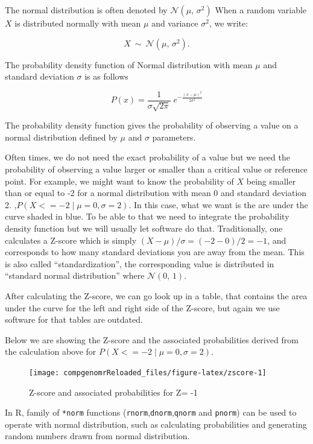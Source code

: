 \documentclass[12pt,]{krantz}
\theoremstyle{definition}
\theoremstyle{definition}
\theoremstyle{definition}
\theoremstyle{remark}
\begin{document}
The normal distribution is often denoted by
\(\mathcal{N}(\mu,\,\sigma^2)\) When a random variable \(X\) is
distributed normally with mean \(\mu\) and variance \(\sigma^2\), we
write:

\[X\ \sim\ \mathcal{N}(\mu,\,\sigma^2).\]

The probability density function of Normal distribution with mean
\(\mu\) and standard deviation \(\sigma\) is as follows

\[P(x)=\frac{1}{\sigma\sqrt{2\pi} } \; e^{ -\frac{(x-\mu)^2}{2\sigma^2} } \]

The probability density function gives the probability of observing a
value on a normal distribution defined by \(\mu\) and \(\sigma\)
parameters.

Often times, we do not need the exact probability of a value but we need
the probability of observing a value larger or smaller than a critical
value or reference point. For example, we might want to know the
probability of \(X\) being smaller than or equal to -2 for a normal
distribution with mean 0 and standard deviation 2.
,\(P(X <= -2 \; | \; \mu=0,\sigma=2)\). In this case, what we want is
the are under the curve shaded in blue. To be able to that we need to
integrate the probability density function but we will usually let
software do that. Traditionally, one calculates a Z-score which is
simply \((X-\mu)/\sigma=(-2-0)/2= -1\), and corresponds to how many
standard deviations you are away from the mean. This is also called
``standardization'', the corresponding value is distributed in
``standard normal distribution'' where \(\mathcal{N}(0,\,1)\).

After calculating the Z-score, we can go look up in a table, that
contains the area under the curve for the left and right side of the
Z-score, but again we use software for that tables are outdated.

Below we are showing the Z-score and the associated probabilities
derived from the calculation above for
\(P(X <= -2 \; | \; \mu=0,\sigma=2)\).

\begin{figure}

{\centering \texttt{[image: compgenomrReloaded\_files/figure-latex/zscore-1]} 

}

\caption{Z-score and associated probabilities for Z= -1}\label{fig:zscore}
\end{figure}

In R, family of \texttt{*norm} functions
(\texttt{rnorm},\texttt{dnorm},\texttt{qnorm} and \texttt{pnorm}) can be
used to operate with normal distribution, such as calculating
probabilities and generating random numbers drawn from normal
distribution.
\end{document}
